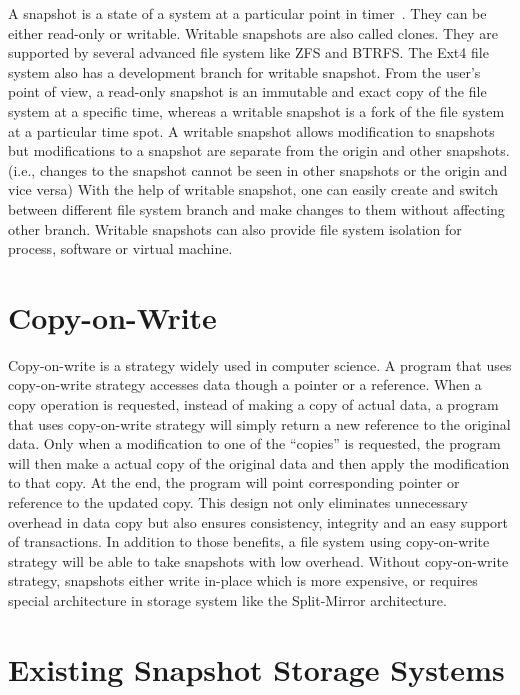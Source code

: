     A snapshot is a state of a system at a particular point in timer~\cite{btrfscow}. They can be either read-only or writable. Writable snapshots are also called clones. They are supported by several advanced file system like ZFS and BTRFS. The Ext4 file system also has a development branch for writable snapshot. From the user’s point of view, a read-only snapshot is an immutable and exact copy of the file system at a specific time, whereas a writable snapshot is a fork of the file system at a particular time spot. A writable snapshot allows modification to snapshots but modifications to a snapshot are separate from the origin and other snapshots. (i.e., changes to the snapshot cannot be seen in other snapshots or the origin and vice versa) With the help of writable snapshot, one can easily create and switch between different file system branch and make changes to them without affecting other branch. Writable snapshots can also provide file system isolation for process, software or virtual machine.

\section{Copy-on-Write}

    Copy-on-write is a strategy widely used in computer science. A program that uses copy-on-write strategy accesses data though a pointer or a reference. When a copy operation is requested, instead of making a copy of actual data, a program that uses copy-on-write strategy will simply return a new reference to the original data. Only when a modification to one of the ``copies'' is requested, the program will then make a actual copy of the original data and then apply the modification to that copy. At the end, the program will point corresponding pointer or reference to the updated copy. This design not only eliminates unnecessary overhead in data copy but also ensures consistency, integrity and an easy support of transactions. In addition to those benefits, a file system using copy-on-write strategy will be able to take snapshots with low overhead. Without copy-on-write strategy, snapshots either write in-place which is more expensive, or requires special architecture in storage system like the Split-Mirror architecture.

\section{Existing Snapshot Storage Systems}

